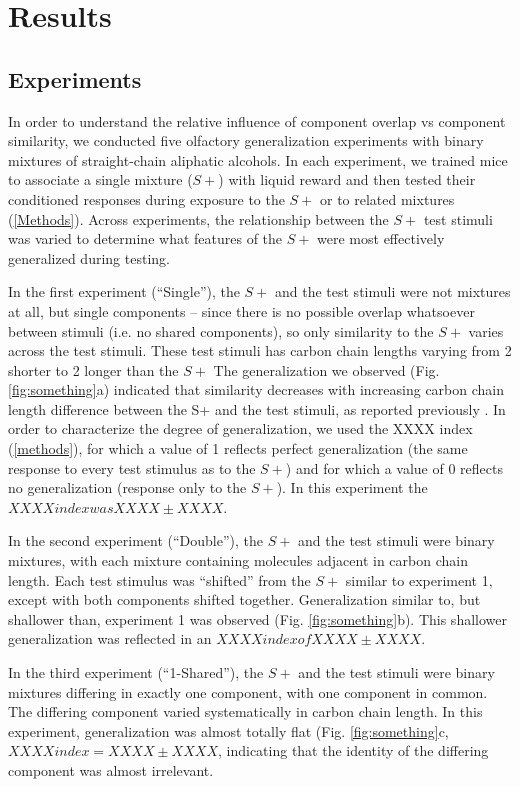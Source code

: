 \section{Results}

\subsection{Experiments}
In order to understand the relative influence of component overlap vs component similarity, we conducted five olfactory generalization experiments with binary mixtures of straight-chain aliphatic alcohols.  In each experiment, we trained mice to associate a single mixture ($S+$) with liquid reward and then tested their conditioned responses during exposure to the $S+$ or to related mixtures (\ref{Methods}).  Across experiments, the relationship between the $S+$ test stimuli was varied to determine what features of the $S+$ were most effectively generalized during testing.  

In the first experiment (``Single''), the $S+$ and the test stimuli were not mixtures at all, but single components -- since there is no possible overlap whatsoever between stimuli (i.e. no shared components), so only similarity to the $S+$ varies across the test stimuli.  These test stimuli has carbon chain lengths varying from 2 shorter to 2 longer than the $S+$  The generalization we observed (Fig. \ref{fig:something}a) indicated that similarity decreases with increasing carbon chain length difference between the S+ and the test stimuli, as reported previously \cite{}.  In order to characterize the degree of generalization, we used the XXXX index (\ref{methods}), for which a value of 1 reflects perfect generalization (the same response to every test stimulus as to the $S+$) and for which a value of 0 reflects no generalization (response only to the $S+$).  In this experiment the $XXXX index was XXXX \pm XXXX$.  

In the second experiment (``Double''), the $S+$ and the test stimuli were binary mixtures, with each mixture containing molecules adjacent in carbon chain length.  Each test stimulus was ``shifted'' from the $S+$ similar to experiment 1, except with both components shifted together.  Generalization similar to, but shallower than, experiment 1 was observed (Fig. \ref{fig:something}b).  This shallower generalization was reflected in an $XXXX index of XXXX \pm XXXX$.  

In the third experiment (``1-Shared''), the $S+$ and the test stimuli were binary mixtures differing in exactly one component, with one component in common.  The differing component varied systematically in carbon chain length.  In this experiment, generalization was almost totally flat (Fig. \ref{fig:something}c, $XXXX index = XXXX \pm XXXX$, indicating that the identity of the differing component was almost irrelevant.  

